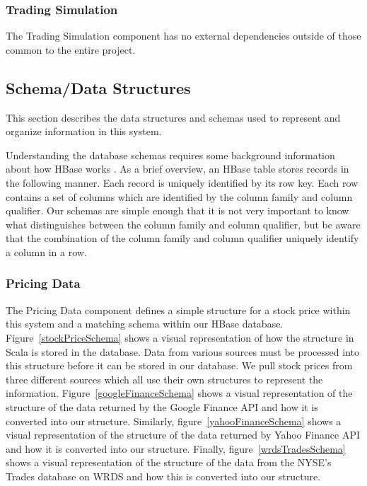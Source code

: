 \subsubsection{Trading Simulation}

The Trading Simulation component has no external dependencies outside of those common to the entire project.

\subsection{Schema/Data Structures}

This section describes the data structures and schemas used to represent and organize information in this system.

Understanding the database schemas requires some background information about how HBase works \cite{hbase}. As a brief overview, an HBase table stores records in the following manner. Each record is uniquely identified by its row key. Each row contains a set of columns which are identified by the column family and column qualifier. Our schemas are simple enough that it is not very important to know what distinguishes between the column family and column qualifier, but be aware that the combination of the column family and column qualifier uniquely identify a column in a row.

\subsubsection{Pricing Data}

The Pricing Data component defines a simple structure for a stock price within this system and a matching schema within our HBase database. Figure~\ref{stockPriceSchema} shows a visual representation of how the structure in Scala is stored in the database. Data from various sources must be processed into this structure before it can be stored in our database. We pull stock prices from three different sources which all use their own structures to represent the information. Figure~\ref{googleFinanceSchema} shows a visual representation of the structure of the data returned by the Google Finance API and how it is converted into our structure. Similarly, figure~\ref{yahooFinanceSchema} shows a visual representation of the structure of the data returned by Yahoo Finance API and how it is converted into our structure. Finally, figure~\ref{wrdsTradesSchema} shows a visual representation of the structure of the data from the NYSE's Trades database on WRDS and how this is converted into our structure.


